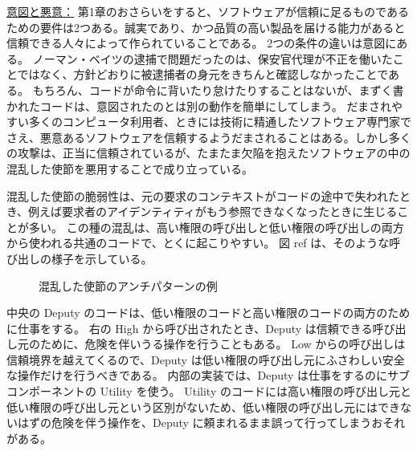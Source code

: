 \documentclass[uplatex]{jsarticle}
\def\ref#1{ref}%
\def\label#1{}%
\begin{document}
\underline{意図と悪意：}
第1章のおさらいをすると、ソフトウェアが信頼に足るものであるための要件は2つある。誠実であり、かつ品質の高い製品を届ける能力があると信頼できる人々によって作られていることである。
2つの条件の違いは意図にある。
ノーマン・ベイツの逮捕で問題だったのは、保安官代理が不正を働いたことではなく、方針どおりに被逮捕者の身元をきちんと確認しなかったことである。
もちろん、コードが命令に背いたり怠けたりすることはないが、まずく書かれたコードは、意図されたのとは別の動作を簡単にしてしまう。
だまされやすい多くのコンピュータ利用者、ときには技術に精通したソフトウェア専門家でさえ、悪意あるソフトウェアを信頼するようだまされることはある。しかし多くの攻撃は、正当に信頼されているが、たまたま欠陥を抱えたソフトウェアの中の混乱した使節を悪用することで成り立っている。

混乱した使節の脆弱性は、元の要求のコンテキストがコードの途中で失われたとき、例えば要求者のアイデンティティがもう参照できなくなったときに生じることが多い。
この種の混乱は、高い権限の呼び出しと低い権限の呼び出しの両方から使われる共通のコードで、とくに起こりやすい。
図 \ref{fig:ch4-confused-deputy} は、そのような呼び出しの様子を示している。

\begin{figure}[H]
\centering
{}
\caption{混乱した使節のアンチパターンの例}\label{fig:ch4-confused-deputy}
\end{figure}

中央の Deputy のコードは、低い権限のコードと高い権限のコードの両方のために仕事をする。
右の High から呼び出されたとき、Deputy は信頼できる呼び出し元のために、危険を伴いうる操作を行うこともある。
Low からの呼び出しは信頼境界を越えてくるので、Deputy は低い権限の呼び出し元にふさわしい安全な操作だけを行うべきである。
内部の実装では、Deputy は仕事をするのにサブコンポーネントの Utility を使う。
Utility のコードには高い権限の呼び出し元と低い権限の呼び出し元という区別がないため、低い権限の呼び出し元にはできないはずの危険を伴う操作を、Deputy に頼まれるまま誤って行ってしまうおそれがある。
\end{document}
